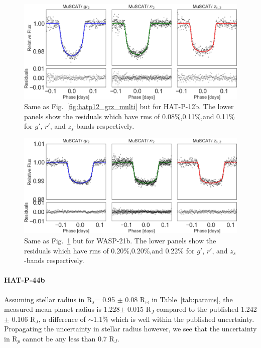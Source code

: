 \begin{figure}
	\includegraphics[width=1\columnwidth]{hatp44/grz_with_rms.png}
    \caption{Same as Fig.~\ref{fig:hatp12_grz_multi} but for HAT-P-12b. The lower panels show the residuals which have rms of 0.08\%,0.11\%,and 0.11\% for $g'$, $r'$, and $z_s$-bands respectively. %
    }\label{fig:hatp44_grz_multi}
\end{figure}

\begin{figure}
	\includegraphics[width=1\columnwidth]{wasp21/grz_with_rms.png}
    \caption{Same as Fig.~\ref{fig:hatp44_grz_multi} but for WASP-21b. The lower panels show the residuals which have rms of 0.20\%,0.20\%,and 0.22\% for $g'$, $r'$, and $z_s$-bands respectively. %
    }\label{fig:wasp21_grz_multi}
\end{figure}


\paragraph{HAT-P-44b}
Assuming stellar radius in R$_s$= 0.95 $\pm$ 0.08 R$_{\odot}$ in Table~\ref{tab:params}, the measured mean planet radius is 1.228$\pm$ 0.015 R$_J$ compared to the published 1.242$\pm$ 0.106 R$_J$, a difference of $\sim$1.1\% which is well within the published uncertainty. Propagating the uncertainty in stellar radius however, we see that the uncertainty in R$_p$ cannot be any less than 0.7 R$_J$.

